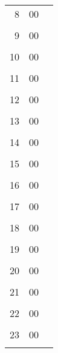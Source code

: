 \renewcommand{\arraystretch}{1.1}
\begin{tabularx}{0.95\linewidth}{r@{:}lX}
  \toprule[1.2pt]
  8&00 & \\\hdashline[2pt/2pt]
  \multicolumn{2}{c}{}& \\\midrule[0.3pt]
  9&00 & \\\hdashline[2pt/2pt]
  \multicolumn{2}{c}{}& \\\midrule[0.3pt]
  10&00 & \\\hdashline[2pt/2pt]
  \multicolumn{2}{c}{}& \\\midrule[0.3pt]
  11&00 & \\\hdashline[2pt/2pt]
  \multicolumn{2}{c}{}& \\\midrule[0.8pt]
  12&00 & \\\hdashline[2pt/2pt]
  \multicolumn{2}{c}{}& \\\midrule[0.3pt]
  13&00 & \\\hdashline[2pt/2pt]
  \multicolumn{2}{c}{}& \\\midrule[0.3pt]
  14&00 & \\\hdashline[2pt/2pt]
  \multicolumn{2}{c}{}& \\\midrule[0.3pt]
  15&00 & \\\hdashline[2pt/2pt]
  \multicolumn{2}{c}{}& \\\midrule[0.3pt]
  16&00 & \\\hdashline[2pt/2pt]
  \multicolumn{2}{c}{}& \\\midrule[0.3pt]
  17&00 & \\\hdashline[2pt/2pt]
  \multicolumn{2}{c}{}& \\\midrule[0.8pt]
  18&00 & \\\hdashline[2pt/2pt]
  \multicolumn{2}{c}{}& \\\midrule[0.3pt]
  19&00 & \\\hdashline[2pt/2pt]
  \multicolumn{2}{c}{}& \\\midrule[0.3pt]
  20&00 & \\\hdashline[2pt/2pt]
  \multicolumn{2}{c}{}& \\\midrule[0.3pt]
  21&00 & \\\hdashline[2pt/2pt]
  \multicolumn{2}{c}{}& \\\midrule[0.3pt]
  22&00 & \\\hdashline[2pt/2pt]
  \multicolumn{2}{c}{}& \\\midrule[0.3pt]
  23&00 & \\\hdashline[2pt/2pt]
  \multicolumn{2}{c}{}& \\
  \bottomrule[1.2pt]
\end{tabularx}
